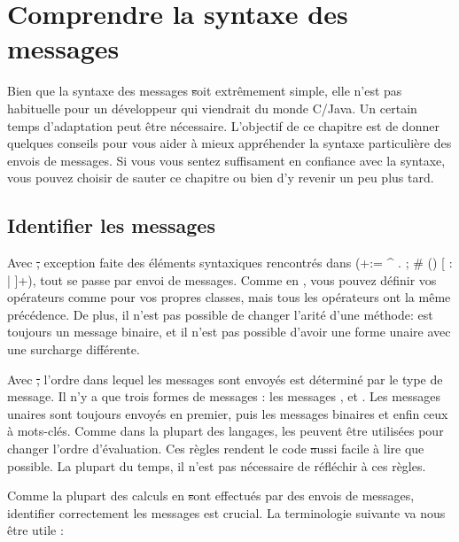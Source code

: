 \documentclass[a4paper,10pt,twoside]{book}
\begin{document}
	\renewcommand{\nnbb}[2]{} %
	\sloppy
\fi
\chapter{Comprendre la syntaxe des messages}

Bien que la syntaxe des messages \st soit extrêmement simple, elle n'est pas 
habituelle pour un développeur qui viendrait du monde C/Java. Un certain temps d'adaptation peut être nécessaire. L'objectif de ce chapitre est de donner quelques conseils pour vous aider à mieux appréhender la syntaxe particulière  des envois de messages.
Si vous vous sentez suffisament en confiance avec la syntaxe, vous pouvez choisir de sauter 
ce chapitre ou bien d'y revenir un peu plus tard.

\section{Identifier les messages}

Avec \st, exception faite des éléments syntaxiques rencontrés dans
 (\ct+:= ^ . ; # () {} [ : | ]+), tout se passe par envoi de messages.
Comme en , vous pouvez définir vos opérateurs comme \ct{+} pour vos propres 
classes, mais tous les opérateurs ont la même précédence.
De plus, il n'est pas possible de changer l'arité d'une méthode:
\ct{-} est toujours un message binaire, et il n'est pas possible
d'avoir une forme unaire avec une surcharge différente.

Avec \st, l'ordre dans lequel les messages sont envoyés est
déterminé par le type de message. Il n'y a que trois formes de
messages : les messages ,
 et .
 Les messages unaires sont toujours envoyés en premier, puis
les messages binaires et enfin ceux à mots-clés. Comme dans la
plupart des langages,  les  peuvent être utilisées 
pour changer l'ordre d'évaluation. Ces règles rendent le code \st 
aussi facile à lire que possible. La plupart du temps, il n'est pas 
nécessaire de réfléchir à ces règles.

Comme la plupart des calculs en \st sont effectués par des envois de 
messages, identifier correctement les messages est crucial. La terminologie 
suivante va nous être utile :
\end{document}
